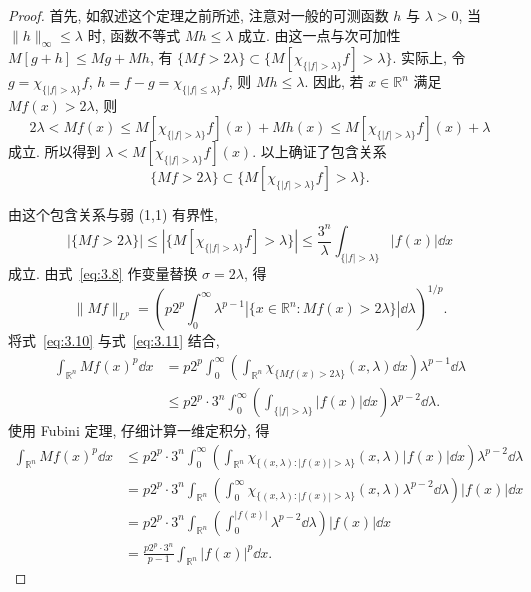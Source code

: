 \begin{proof}
首先, 如叙述这个定理之前所述, 注意对一般的可测函数 $h$ 与 $\lambda > 0$, 当 $\|h\|_{\infty} \leq \lambda$ 时, 函数不等式 $Mh \leq \lambda$ 成立. 由这一点与次可加性 $M[g+h] \leq Mg + Mh$, 有 $\{Mf > 2\lambda\} \subset \{M[\chi_{\{|f| > \lambda\}}f] > \lambda\}$. 实际上, 令 $g = \chi_{\{|f| > \lambda\}}f$, $h = f - g = \chi_{\{|f| \leq \lambda\}}f$, 则 $Mh \leq \lambda$. 因此, 若 $x \in \mathbb{R}^{n}$ 满足 $Mf(x) > 2\lambda$, 则
\[
2\lambda < Mf(x) \leq M[\chi_{\{|f| > \lambda\}}f](x) + Mh(x) \leq M[\chi_{\{|f| > \lambda\}}f](x) + \lambda
\]
成立. 所以得到 $\lambda < M[\chi_{\{|f| > \lambda\}}f](x)$. 以上确证了包含关系
\[
\{Mf > 2\lambda\} \subset \{M[\chi_{\{|f| > \lambda\}}f] > \lambda\}.
\]

由这个包含关系与弱 (1,1) 有界性,
\begin{equation}\tag{3.10}
|\{Mf > 2\lambda\}| \leq |\{M[\chi_{\{|f| > \lambda\}}f] > \lambda\}| \leq \frac{3^{n}}{\lambda}\int_{\{|f| > \lambda\}}|f(x)|\dd x
\label{eq:3.10}
\end{equation}
成立. 由式~\eqref{eq:3.8} 作变量替换 $\sigma = 2\lambda$, 得
\begin{equation}\tag{3.11}
\|Mf\|_{L^{p}} = \left(p2^{p}\int_{0}^{\infty}\lambda^{p-1}|\{x \in \mathbb{R}^{n}: Mf(x) > 2\lambda\}|\dd\lambda\right)^{1/p}.
\label{eq:3.11}
\end{equation}
将式~\eqref{eq:3.10} 与式~\eqref{eq:3.11} 结合,
\begin{align*}
\int_{\mathbb{R}^{n}}Mf(x)^{p}\dd x &= p2^{p}\int_{0}^{\infty}\left(\int_{\mathbb{R}^{n}}\chi_{\{Mf(x) > 2\lambda\}}(x,\lambda)\dd x\right)\lambda^{p-1}\dd\lambda \\
&\leq p2^{p}\cdot 3^{n}\int_{0}^{\infty}\left(\int_{\{|f| > \lambda\}}|f(x)|\dd x\right)\lambda^{p-2}\dd\lambda.
\end{align*}
使用 Fubini 定理, 仔细计算一维定积分, 得
\begin{align*}
\int_{\mathbb{R}^{n}}Mf(x)^{p}\dd x
&\leq p2^{p}\cdot 3^{n}\int_{0}^{\infty}\left(\int_{\mathbb{R}^{n}}\chi_{\{(x,\lambda): |f(x)| > \lambda\}}(x,\lambda)|f(x)|\dd x\right)\lambda^{p-2}\dd\lambda \\
&= p2^{p}\cdot 3^{n}\int_{\mathbb{R}^{n}}\left(\int_{0}^{\infty}\chi_{\{(x,\lambda): |f(x)| > \lambda\}}(x,\lambda)\lambda^{p-2}\dd\lambda\right)|f(x)|\dd x \\
&= p2^{p}\cdot 3^{n}\int_{\mathbb{R}^{n}}\left(\int_{0}^{|f(x)|}\lambda^{p-2}\dd\lambda\right)|f(x)|\dd x \\
&= \frac{p2^{p}\cdot 3^{n}}{p-1}\int_{\mathbb{R}^{n}}|f(x)|^{p}\dd x.
\end{align*}
\end{proof}


